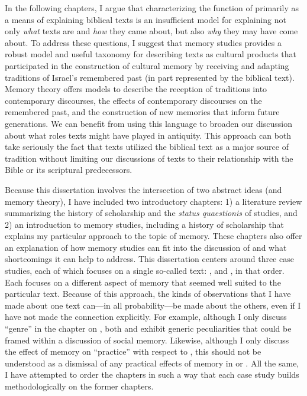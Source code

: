 In the following chapters, I argue that characterizing the function of \rwb primarily as a means of explaining biblical texts is an insufficient model for explaining not only \emph{what} \rwb texts are and \emph{how} they came about, but also \emph{why} they may have come about. To address these questions, I suggest that memory studies provides a robust model and useful taxonomy for describing \rwb texts as cultural products that participated in the construction of cultural memory by receiving and adapting traditions of Israel's remembered past (in part represented by the biblical text). Memory theory offers models to describe the reception of traditions into contemporary discourses, the effects of contemporary discourses on the remembered past, and the construction of new memories that inform future generations. We can benefit from using this language to broaden our discussion about what roles \rwb texts might have played in antiquity. This approach can both take seriously the fact that \rwb texts utilized the biblical text as a major source of tradition without limiting our discussions of \rwb texts to their relationship with the Bible or its scriptural predecessors.



Because this dissertation involves the intersection of two abstract ideas (\rwb and memory theory), I have included two introductory chapters: 1) a literature review summarizing the history of scholarship and the \emph{status quaestionis} of \rwb studies, and 2) an introduction to memory studies, including a history of scholarship that explains my particular approach to the topic of memory. These chapters also offer an explanation of how memory studies can fit into the discussion of \rwb and what shortcomings it can help to address. This dissertation centers around three case studies, each of which focuses on a single so-called \rwb text: \chronicles, \ga and \jub, in that order. Each focuses on a different aspect of memory that seemed well suited to the particular text. Because of this approach, the kinds of observations that I have made about one text can---in all probability---be made about the others, even if I have not made the connection explicitly. For example, although I only discuss ``genre'' in the chapter on \ga, both \chronicles and \jub exhibit generic peculiarities that could be framed within a discussion of social memory. Likewise, although I only discuss the effect of memory on ``practice'' with respect to \jub, this should not be understood as a dismissal of any practical effects of memory in \chronicles or \ga. All the same, I have attempted to order the chapters in such a way that each case study builds methodologically on the former chapters.

